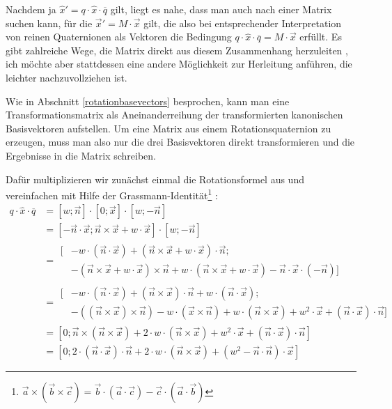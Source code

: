 Nachdem ja $\hat{x}'= q \cdot \hat{x} \cdot \overline{q}$ gilt, liegt es nahe, dass man auch nach einer Matrix suchen kann, für die $\vec{x}' = M \cdot \vec{x}$ gilt, die also bei entsprechender Interpretation von reinen Quaternionen als Vektoren die Bedingung $q \cdot \hat{x} \cdot \overline{q} = M \cdot \vec{x}$ erfüllt. Es gibt zahlreiche Wege, die Matrix direkt aus diesem Zusammenhang herzuleiten , ich möchte aber stattdessen eine andere Möglichkeit zur Herleitung anführen, die leichter nachzuvollziehen ist.

Wie in Abschnitt \ref{rotationbasevectors} besprochen, kann man eine Transformationsmatrix als Aneinanderreihung der transformierten kanonischen Basisvektoren aufstellen. Um eine Matrix aus einem Rotationsquaternion zu erzeugen, muss man also nur die drei Basisvektoren direkt transformieren und die Ergebnisse in die Matrix schreiben.

Dafür multiplizieren wir zunächst einmal die Rotationsformel aus und vereinfachen mit Hilfe der Grassmann-Identität\footnote{$\vec a \times ( \vec b \times \vec c ) = \vec b \cdot ( \vec a \cdot \vec c ) - \vec c \cdot ( \vec a \cdot \vec b)$} :
\begin{equation}
\begin{split}
 q \cdot \hat{x} \cdot \overline{q} &= \left[ w; \vec n \right] \cdot \left[ 0; \vec x \right] \cdot \left[ w; -\vec n \right] \\
 &= \left[ - \vec n \cdot \vec x; \vec n \times \vec x + w \cdot \vec x \right] \cdot \left[ w; -\vec n \right] \\
 &= \begin{split}[ &- w \cdot ( \vec n \cdot \vec x ) + ( \vec n \times \vec x + w \cdot \vec x ) \cdot \vec n; \\
  &- ( \vec n \times \vec x + w \cdot \vec x ) \times \vec n + w \cdot ( \vec n \times \vec x + w \cdot \vec x ) - \vec n \cdot \vec x \cdot ( - \vec n ) ] \end{split} \\
 &= \begin{split}[ &- w \cdot ( \vec n \cdot \vec x ) + ( \vec n \times \vec x ) \cdot \vec n + w \cdot ( \vec n \cdot \vec x ); \\
  &- ( ( \vec n \times \vec x ) \times \vec n ) - w \cdot ( \vec x \times \vec n ) + w \cdot ( \vec n \times \vec x ) + w^2 \cdot \vec x + ( \vec n \cdot \vec x ) \cdot \vec n ] \end{split} \\
 &= \left[ 0; \vec n \times ( \vec n \times \vec x ) + 2 \cdot w \cdot ( \vec n \times \vec x ) + w^2 \cdot \vec x + ( \vec n \cdot \vec x ) \cdot \vec n \right] \\
 &= \left[ 0; 2 \cdot ( \vec n \cdot \vec x ) \cdot \vec n + 2 \cdot w \cdot ( \vec n \times \vec x ) + ( w^2 - \vec n \cdot \vec n ) \cdot \vec x \right]
\end{split}
\end{equation}

